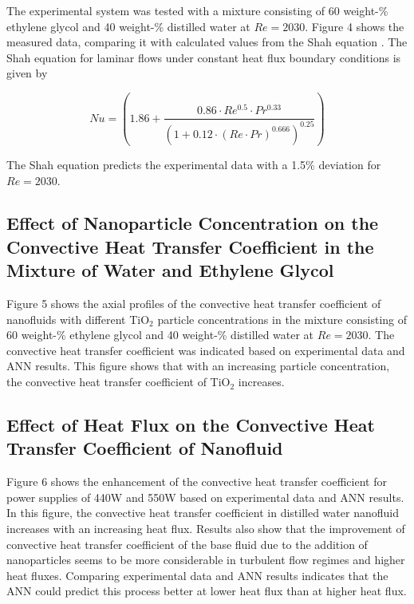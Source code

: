 \documentclass{article}
\begin{document}
The experimental system was tested with a mixture consisting of 60 weight-\% ethylene glycol and 40 weight-\% distilled water at $Re = 2030$. Figure 4 shows the measured data, comparing it with calculated values from the Shah equation \cite{ref10}. The Shah equation for laminar flows under constant heat flux boundary conditions is given by 

\begin{equation}
Nu = \left(1.86 + \frac{0.86 \cdot Re^{0.5} \cdot Pr^{0.33}}{\left(1 + 0.12 \cdot (Re \cdot Pr)^{0.666}\right)^{0.25}}\right)
\label{eq:shah}
\end{equation}

The Shah equation predicts the experimental data with a 1.5\% deviation for $Re = 2030$.

\subsection{Effect of Nanoparticle Concentration on the Convective Heat Transfer Coefficient in the Mixture of Water and Ethylene Glycol}

Figure 5 shows the axial profiles of the convective heat transfer coefficient of nanofluids with different TiO$_2$ particle concentrations in the mixture consisting of 60 weight-\% ethylene glycol and 40 weight-\% distilled water at $Re = 2030$. The convective heat transfer coefficient was indicated based on experimental data and ANN results. This figure shows that with an increasing particle concentration, the convective heat transfer coefficient of TiO$_2$ increases.

\subsection{Effect of Heat Flux on the Convective Heat Transfer Coefficient of Nanofluid}

Figure 6 shows the enhancement of the convective heat transfer coefficient for power supplies of 440W and 550W based on experimental data and ANN results. In this figure, the convective heat transfer coefficient in distilled water nanofluid increases with an increasing heat flux. Results also show that the improvement of convective heat transfer coefficient of the base fluid due to the addition of nanoparticles seems to be more considerable in turbulent flow regimes and higher heat fluxes. Comparing experimental data and ANN results indicates that the ANN could predict this process better at lower heat flux than at higher heat flux.
\end{document}
